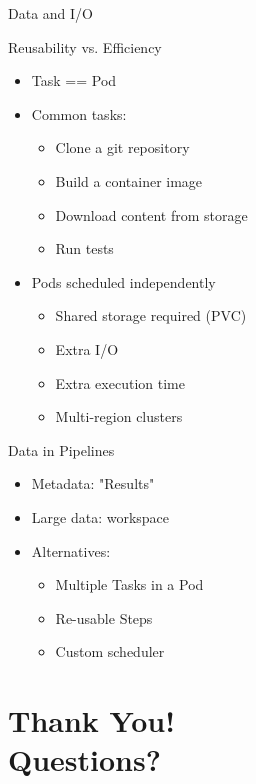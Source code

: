 \documentclass[aspectratio=169,11pt,hyperref={colorlinks=true}]{beamer}
\begin{document}
\begin{3squares}%
  {%
    Data and I/O
  }%
  {%
  Reusability vs. Efficiency
  \begin{itemize}
    \item Task == Pod %
    \item Common tasks:
    \begin{itemize}
      \item Clone a git repository
      \item Build a container image
      \item Download content from storage
      \item Run tests
    \end{itemize}
  \end{itemize}
  }%
  {%
  \begin{itemize}
    \item Pods scheduled independently
    \begin{itemize}
      \item Shared storage required (PVC)
      \item Extra I/O
      \item Extra execution time
      \item Multi-region clusters
    \end{itemize}
  \end{itemize}
  }%
  {%
  Data in Pipelines
  \begin{itemize}
  \item Metadata: "Results"
  \item Large data: workspace
  \item Alternatives:
    \begin{itemize}
      \item Multiple Tasks in a Pod
      \item Re-usable Steps
      \item Custom scheduler
    \end{itemize}
  \end{itemize}
  }%
\end{3squares}

\section[Q\&A]{Thank You! \\Questions?}
\end{document}

